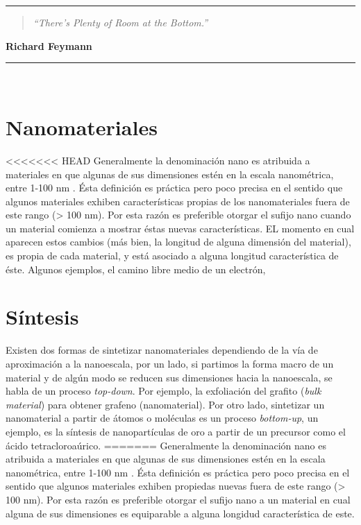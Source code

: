 \noindent
\rule{\linewidth}{1 pt}
\begin{flushright}
	\begin{quotation}
		\small{
			\textit{``There’s Plenty of Room at the Bottom.''}}
	\end{quotation}
	\bf{Richard Feymann}
\end{flushright}
\noindent
\rule{\linewidth}{1 pt}\\
\vfill
\section{Nanomateriales}
<<<<<<< HEAD
Generalmente la denominación nano es atribuida a materiales en que algunas de sus dimensiones estén en la escala nanométrica, entre 1-100 nm \cite{Gressler2013}. Ésta definición es práctica pero poco precisa en el sentido que algunos materiales exhiben características propias de los nanomateriales fuera de este rango (> 100 nm). Por esta razón es preferible otorgar el sufijo nano cuando un material comienza a mostrar éstas nuevas características. EL momento en cual aparecen estos cambios (más bien, la longitud de alguna dimensión del material), es propia de cada material, y está asociado a alguna longitud característica de éste. Algunos ejemplos, el camino libre medio de un electrón, 
\section{Síntesis}
Existen dos formas de sintetizar nanomateriales dependiendo de la vía de aproximación a la nanoescala, por un lado, si partimos la forma macro de un material y de algún modo se reducen sus dimensiones hacia la nanoescala, se habla de un proceso \textit{top-down}. Por ejemplo, la exfoliación del grafito (\textit{bulk material}) para obtener grafeno (nanomaterial).  Por otro lado, sintetizar un nanomaterial a partir de átomos o moléculas es un proceso \textit{bottom-up}, un ejemplo, es la síntesis de nanopartículas de oro a partir de un precursor como el ácido tetracloroaúrico.
=======
Generalmente la denominación nano es atribuida a materiales en que algunas de sus dimensiones estén en la escala nanométrica, entre 1-100 nm \cite{Gressler2013}. Ésta definición es práctica pero poco precisa en el sentido que algunos materiales exhiben propiedas nuevas fuera de este rango (> 100 nm). Por esta razón es preferible otorgar el sufijo nano a un material en cual alguna de sus dimensiones es equiparable a alguna longidud característica de este.

